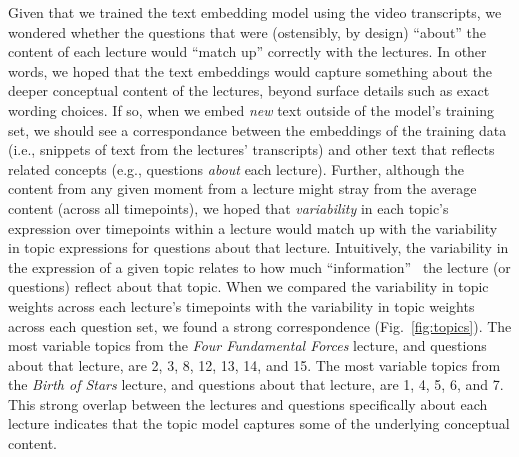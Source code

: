 \documentclass[10pt]{article}
\begin{document}
Given that we trained the text embedding model using the video transcripts, we
wondered whether the questions that were (ostensibly, by design) ``about'' the
content of each lecture would ``match up'' correctly with the lectures. In
other words, we hoped that the text embeddings would capture something about
the deeper conceptual content of the lectures, beyond surface details such as
exact wording choices. If so, when we embed \textit{new} text outside of the
model's training set, we should see a correspondance between the embeddings of
the training data (i.e., snippets of text from the lectures' transcripts) and
other text that reflects related concepts (e.g., questions \textit{about} each
lecture). Further, although the content from any given moment from a lecture
might stray from the average content (across all timepoints), we hoped that
\textit{variability} in each topic's expression over timepoints within a
lecture would match up with the variability in topic expressions for questions
about that lecture. Intuitively, the variability in the expression of a given
topic relates to how much ``information''~\citep{Fish22} the lecture (or
questions) reflect about that topic. When we compared the variability in topic
weights across each lecture's timepoints with the variability in topic weights
across each question set, we found a strong correspondence
(Fig.~\ref{fig:topics}). The most variable topics from the \textit{Four
Fundamental Forces} lecture, and questions about that lecture, are 2, 3, 8, 12,
13, 14, and 15. The most variable topics from the \textit{Birth of Stars}
lecture, and questions about that lecture, are 1, 4, 5, 6, and 7. This strong
overlap between the lectures and questions specifically about each lecture
indicates that the topic model captures some of the underlying conceptual
content.
\end{document}

